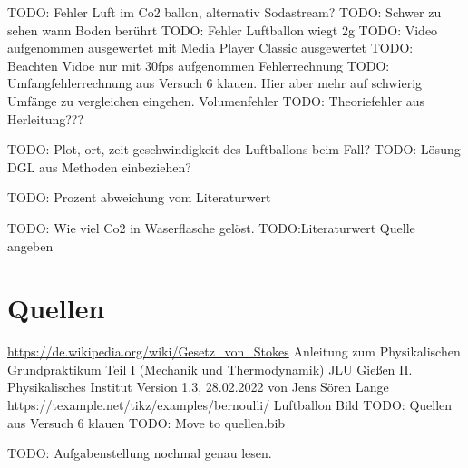 \documentclass{article}
\begin{document}
        TODO: Fehler Luft im Co2 ballon, alternativ Sodastream?
        TODO: Schwer zu sehen wann Boden berührt
        TODO: Fehler Luftballon wiegt 2g
        TODO: Video aufgenommen ausgewertet mit Media Player Classic ausgewertet
        TODO: Beachten Vidoe nur mit 30fps aufgenommen Fehlerrechnung
        TODO: Umfangfehlerrechnung aus Versuch 6 klauen. Hier aber mehr auf schwierig Umfänge zu vergleichen eingehen. Volumenfehler
        TODO: Theoriefehler aus Herleitung???


    TODO: Plot, ort, zeit geschwindigkeit des Luftballons beim Fall?
    TODO: Lösung DGL aus Methoden einbeziehen?

    TODO: Prozent abweichung vom Literaturwert

    TODO: Wie viel Co2 in Waserflasche gelöst.
    TODO:Literaturwert Quelle angeben

    \section{Quellen}
        \url{https://de.wikipedia.org/wiki/Gesetz_von_Stokes}
        Anleitung zum Physikalischen Grundpraktikum Teil I (Mechanik und Thermodynamik) JLU Gießen II. Physikalisches Institut Version 1.3, 28.02.2022 von Jens Sören Lange
        https://texample.net/tikz/examples/bernoulli/
        Luftballon Bild
        TODO: Quellen aus Versuch 6 klauen
        TODO: Move to quellen.bib

    TODO: Aufgabenstellung nochmal genau lesen.
\end{document}
